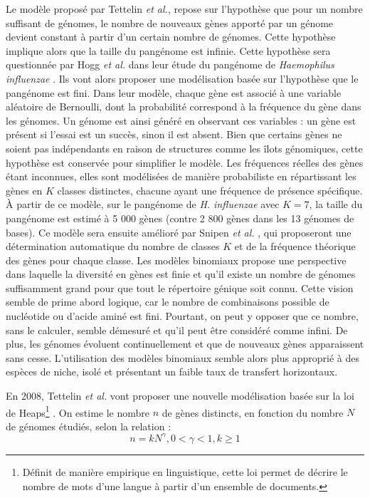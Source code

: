 Le modèle proposé par Tettelin \textit{et al.}, repose sur l'hypothèse que pour un nombre suffisant de génomes, le nombre de nouveaux gènes apporté par un génome devient constant à partir d'un certain nombre de génomes. Cette hypothèse implique alors que la taille du pangénome est infinie. Cette hypothèse sera questionnée par Hogg \textit{et al.} dans leur étude du pangénome de \textit{Haemophilus influenzae} \cite{hogg_characterization_2007}. Ils vont alors proposer une modélisation basée sur l'hypothèse que le pangénome est fini. Dans leur modèle, chaque gène est associé à une variable aléatoire de Bernoulli, dont la probabilité correspond à la fréquence du gène dans les génomes. Un génome est ainsi généré en observant ces variables : un gène est présent si l’essai est un succès, sinon il est absent. Bien que certains gènes ne soient pas indépendants en raison de structures comme les îlots génomiques, cette hypothèse est conservée pour simplifier le modèle. Les fréquences réelles des gènes étant inconnues, elles sont modélisées de manière probabiliste en répartissant les gènes en $K$ classes distinctes, chacune ayant une fréquence de présence spécifique. À partir de ce modèle, sur le pangénome de \textit{H. influenzae} avec $K=7$, la taille du pangénome est estimé à 5 000 gènes (contre 2 800 gènes dans les 13 génomes de bases). Ce modèle sera ensuite amélioré par Snipen \textit{et al.} \cite{snipen_microbial_2009}, qui proposeront une détermination automatique du nombre de classes $K$ et de la fréquence théorique des gènes pour chaque classe. Les modèles binomiaux propose une perspective dans laquelle la diversité en gènes est finie et qu'il existe un nombre de génomes suffisamment grand pour que tout le répertoire génique soit connu. Cette vision semble de prime abord logique, car le nombre de combinaisons possible de nucléotide ou d'acide aminé est fini. Pourtant, on peut y opposer que ce nombre, sans le calculer, semble démesuré et qu'il peut être considéré comme infini. De plus, les génomes évoluent continuellement et que de nouveaux gènes apparaissent sans cesse. L'utilisation des modèles binomiaux semble alors plus approprié à des espèces de niche, isolé et présentant un faible taux de transfert horizontaux.

En 2008, Tettelin \textit{et al.} vont proposer une nouvelle modélisation basée sur la loi de Heaps\footnote{Définit de manière empirique en linguistique, cette loi permet de décrire le nombre de mots d'une langue à partir d'un ensemble de documents.} \cite{tettelin_comparative_2008}. On estime le nombre $n$ de gènes distincts, en fonction du nombre $N$ de génomes étudiés, selon la relation :
\begin{equation}
    n=kN^\gamma, 0<\gamma<1,k\geq1
\end{equation}

